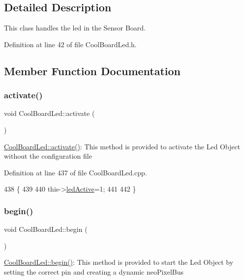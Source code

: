 \subsection{Detailed Description}
This class handles the led in the Sensor Board. 

Definition at line 42 of file Cool\+Board\+Led.\+h.



\subsection{Member Function Documentation}
\mbox{\label{class_cool_board_led_ae74fe4b47d06c3a97b468ba220c4eb99}} 
\subsubsection{\texorpdfstring{activate()}{activate()}}
{\footnotesize\ttfamily void Cool\+Board\+Led\+::activate (\begin{DoxyParamCaption}{ }\end{DoxyParamCaption})}

\hyperlink{class_cool_board_led_ae74fe4b47d06c3a97b468ba220c4eb99}{Cool\+Board\+Led\+::activate()}\+: This method is provided to activate the Led Object without the configuration file 

Definition at line 437 of file Cool\+Board\+Led.\+cpp.


\begin{DoxyCode}
438 \{
439 
440     this->\hyperlink{class_cool_board_led_aadd04d2ecf123247718d77f42fba7f08}{ledActive}=1;
441 
442 \}
\end{DoxyCode}
\mbox{\label{class_cool_board_led_ae3cbde8affcc6f011cbd698c8ef911f6}} 
\subsubsection{\texorpdfstring{begin()}{begin()}}
{\footnotesize\ttfamily void Cool\+Board\+Led\+::begin (\begin{DoxyParamCaption}{ }\end{DoxyParamCaption})}

\hyperlink{class_cool_board_led_ae3cbde8affcc6f011cbd698c8ef911f6}{Cool\+Board\+Led\+::begin()}\+: This method is provided to start the Led Object by setting the correct pin and creating a dynamic neo\+Pixel\+Bus 

